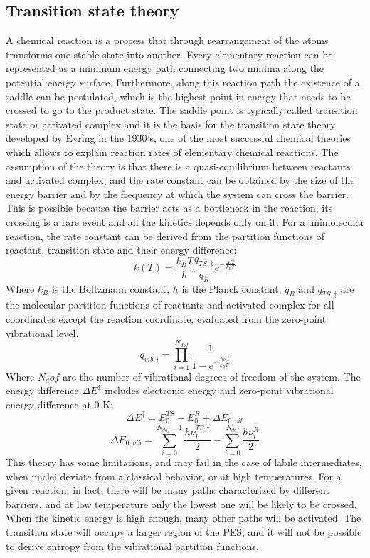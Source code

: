 \subsection*{Transition state theory}
A chemical reaction is a process that through rearrangement of the atoms transforms one stable state into another. Every elementary reaction can be represented as a minimum energy path connecting two minima along the potential energy surface. Furthermore, along this reaction path the existence of a saddle can be postulated, which is the highest point in energy that needs to be crossed to go to the product state. 
The saddle point is typically called transition state or activated complex and it is the basis for the transition state theory developed by Eyring in the 1930’s, one of the most successful chemical theories which allows to explain reaction rates of elementary chemical reactions. The assumption of the theory is that there is a quasi-equilibrium between reactants and activated complex, and the rate constant can be obtained by the size of the energy barrier and by the frequency at which the system can cross the barrier. This is possible because the barrier acts as a bottleneck in the reaction, its crossing is a rare event and all the kinetics depends only on it. For a unimolecular reaction, the rate constant can be derived from the partition functions of reactant, transition state and their energy difference:
\[
k(T) = \dfrac{{k_B T}}{h}
\dfrac{{q_{TS,\ddagger}}}{{q_R}} e^{- \frac{\Delta E^{\ddagger}}{k_B T}}
\]
Where $k_B$ is the Boltzmann constant, $h$ is the Planck constant, $q_R$  and  $q_{TS,\ddagger}$ are the molecular partition functions of reactants and activated complex for all coordinates except the reaction coordinate, evaluated from the zero-point vibrational level. 
\[
q_{vib,i} = \prod_{i=1}^{N_{dof}} \dfrac{1}{1 - e^{- \frac{h \nu_{i}}{k_B T}}}
\]
Where $N_dof$ are the number of vibrational degrees of freedom of the system. The energy difference $\Delta E^{\ddagger}$ includes electronic energy and zero-point vibrational energy difference at 0 K:
\[
\Delta E^{\ddagger} = E_{0}^{TS} - E_{0}^{R} + \Delta E_{0,vib}
\]
\[
\Delta E_{0,vib} = \sum_{i=0}^{N_{dof}-1} \frac{h \nu_{i}^{TS,\ddagger}}{2}
- \sum_{i=0}^{N_{dof}} \frac{h \nu_{i}^{R}}{2}
\]
This theory has some limitations, and may fail in the case of labile intermediates, when nuclei deviate from a classical behavior, or at high temperatures. For a given reaction, in fact, there will be many paths characterized by different barriers, and at low temperature only the lowest one will be likely to be crossed. When the kinetic energy is high enough, many other paths will be activated. The transition state will occupy a larger region of the PES, and it will not be possible to derive entropy from the vibrational partition functions.

